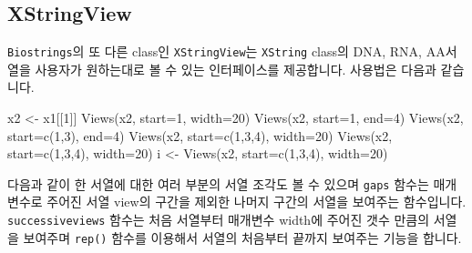 \documentclass[
  a4paper,
]{book}
\newenvironment{Shaded}{\begin{snugshade}}{\end{snugshade}}
\newcommand{\AttributeTok}[1]{\textcolor[rgb]{0.40,0.45,0.13}{#1}}
\newcommand{\DecValTok}[1]{\textcolor[rgb]{0.68,0.00,0.00}{#1}}
\newcommand{\FunctionTok}[1]{\textcolor[rgb]{0.28,0.35,0.67}{#1}}
\newcommand{\NormalTok}[1]{\textcolor[rgb]{0.00,0.23,0.31}{#1}}
\newcommand{\OtherTok}[1]{\textcolor[rgb]{0.00,0.23,0.31}{#1}}
\begin{document}
\hypertarget{xstringview}{%
\subsection{XStringView}\label{xstringview}}

\texttt{Biostrings}의 또 다른 class인 \texttt{XStringView}는
\texttt{XString} class의 DNA, RNA, AA서열을 사용자가 원하는대로 볼 수
있는 인터페이스를 제공합니다. 사용법은 다음과 같습니다.

\begin{Shaded}
\begin{Highlighting}[]
\NormalTok{x2 }\OtherTok{\textless{}{-}}\NormalTok{ x1[[}\DecValTok{1}\NormalTok{]]}
\FunctionTok{Views}\NormalTok{(x2, }\AttributeTok{start=}\DecValTok{1}\NormalTok{, }\AttributeTok{width=}\DecValTok{20}\NormalTok{)}
\FunctionTok{Views}\NormalTok{(x2, }\AttributeTok{start=}\DecValTok{1}\NormalTok{, }\AttributeTok{end=}\DecValTok{4}\NormalTok{)}
\FunctionTok{Views}\NormalTok{(x2, }\AttributeTok{start=}\FunctionTok{c}\NormalTok{(}\DecValTok{1}\NormalTok{,}\DecValTok{3}\NormalTok{), }\AttributeTok{end=}\DecValTok{4}\NormalTok{)}
\FunctionTok{Views}\NormalTok{(x2, }\AttributeTok{start=}\FunctionTok{c}\NormalTok{(}\DecValTok{1}\NormalTok{,}\DecValTok{3}\NormalTok{,}\DecValTok{4}\NormalTok{), }\AttributeTok{width=}\DecValTok{20}\NormalTok{)}
\FunctionTok{Views}\NormalTok{(x2, }\AttributeTok{start=}\FunctionTok{c}\NormalTok{(}\DecValTok{1}\NormalTok{,}\DecValTok{3}\NormalTok{,}\DecValTok{4}\NormalTok{), }\AttributeTok{width=}\DecValTok{20}\NormalTok{)}
\NormalTok{i }\OtherTok{\textless{}{-}} \FunctionTok{Views}\NormalTok{(x2, }\AttributeTok{start=}\FunctionTok{c}\NormalTok{(}\DecValTok{1}\NormalTok{,}\DecValTok{3}\NormalTok{,}\DecValTok{4}\NormalTok{), }\AttributeTok{width=}\DecValTok{20}\NormalTok{)}
\end{Highlighting}
\end{Shaded}

다음과 같이 한 서열에 대한 여러 부분의 서열 조각도 볼 수 있으며
\texttt{gaps} 함수는 매개변수로 주어진 서열 view의 구간을 제외한 나머지
구간의 서열을 보여주는 함수입니다. \texttt{successiveviews} 함수는 처음
서열부터 매개변수 width에 주어진 갯수 만큼의 서열을 보여주며
\texttt{rep()} 함수를 이용해서 서열의 처음부터 끝까지 보여주는 기능을
합니다.
\end{document}
